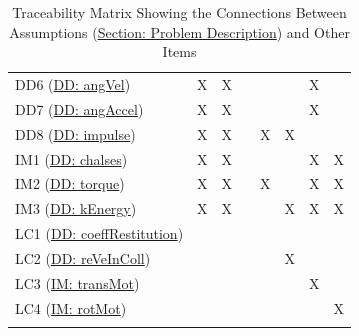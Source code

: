\documentclass[12pt]{article}
\begin{document}
\begin{longtable}{l l l l l l l l}
\\
DD6 (\hyperref[DD:angVel]{DD: angVel}) & X & X &  &  &  & X & 
\\
DD7 (\hyperref[DD:angAccel]{DD: angAccel}) & X & X &  &  &  & X & 
\\
DD8 (\hyperref[DD:impulse]{DD: impulse}) & X & X &  & X & X &  & 
\\
IM1 (\hyperref[DD:chalses]{DD: chalses}) & X & X &  &  &  & X & X
\\
IM2 (\hyperref[DD:torque]{DD: torque}) & X & X &  & X &  & X & X
\\
IM3 (\hyperref[DD:kEnergy]{DD: kEnergy}) & X & X &  &  & X & X & X
\\
LC1 (\hyperref[DD:coeffRestitution]{DD: coeffRestitution}) &  &  &  &  &  &  & 
\\
LC2 (\hyperref[DD:reVeInColl]{DD: reVeInColl}) &  &  &  &  & X &  & 
\\
LC3 (\hyperref[IM:transMot]{IM: transMot}) &  &  &  &  &  & X & 
\\
LC4 (\hyperref[IM:rotMot]{IM: rotMot}) &  &  &  &  &  &  & X
\\
\bottomrule
\caption{Traceability Matrix Showing the Connections Between Assumptions (\hyperref[Sec:ProbDesc]{Section: Problem Description}) and Other Items}
\label{Table:TraceyAssumpsOther}
\end{longtable}
\end{document}
